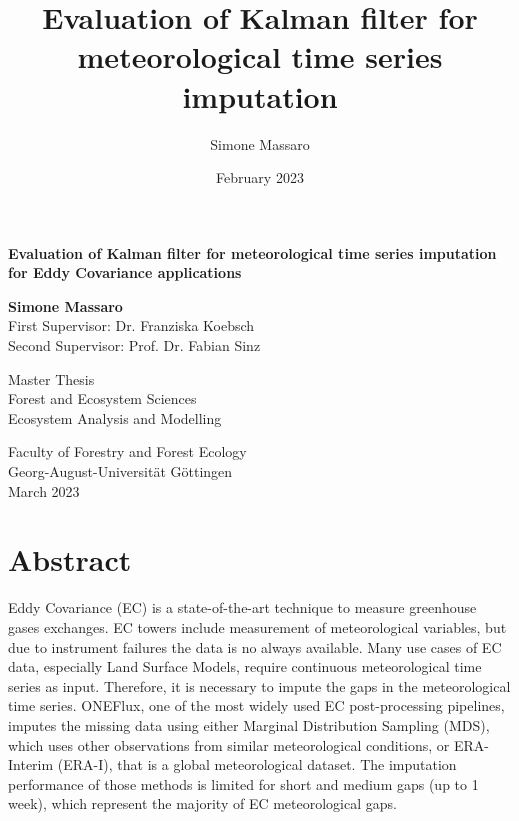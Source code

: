 \documentclass{article}
\title{Evaluation of Kalman filter for meteorological time series imputation}
\author{Simone Massaro}
\date{February 2023}
\let\Oldsection\section
\renewcommand{\section}{\FloatBarrier\Oldsection}
\begin{document}
\newcommand{\vv}[1]{\texttt{#1}}

\begin{titlepage}
    \begin{center}
        \vspace*{1cm}
            
        \Huge
        \textbf{Evaluation of Kalman filter for meteorological time series imputation for Eddy Covariance applications}
            
        \vspace{0.5cm}
        \LARGE
            
        \vspace{1.5cm}
            
        \textbf{Simone Massaro} \\
        \vspace{1cm}
        First Supervisor: Dr. Franziska Koebsch\\
        Second Supervisor: Prof. Dr. Fabian Sinz 
        \vfill
            
        Master Thesis\\
        Forest and Ecosystem Sciences\\
        Ecosystem Analysis and Modelling
            
        \vspace{0.8cm}
            
        \Large
        Faculty of Forestry and Forest Ecology \\
        Georg-August-Universität Göttingen \\
        \vspace{0.3cm}
        March 2023
            
    \end{center}
\end{titlepage}
\clearpage

\section*{Abstract}

Eddy Covariance (EC) is a state-of-the-art technique to measure greenhouse gases exchanges. EC towers include measurement of meteorological variables, but due to instrument failures the data is no always available. Many use cases of EC data, especially Land Surface Models, require continuous meteorological time series as input. Therefore, it is necessary to impute the gaps in the meteorological time series. ONEFlux, one of the most widely used EC post-processing pipelines, imputes the missing data using either Marginal Distribution Sampling (MDS), which uses other observations from similar meteorological conditions, or ERA-Interim (ERA-I), that is a global meteorological dataset. The imputation performance of those methods is limited for short and medium gaps (up to 1 week), which represent the majority of EC meteorological gaps.
\end{document}
